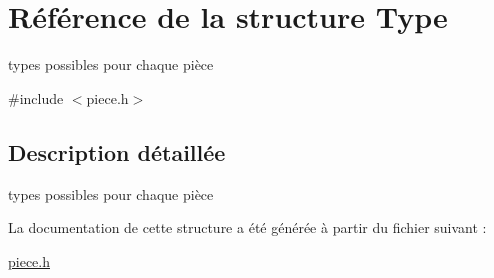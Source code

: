 \hypertarget{struct_type}{\section{Référence de la structure Type}
\label{struct_type}
}


types possibles pour chaque pièce  




{\ttfamily \#include $<$piece.\-h$>$}



\subsection{Description détaillée}
types possibles pour chaque pièce 

La documentation de cette structure a été générée à partir du fichier suivant \-:\begin{DoxyCompactItemize}
\item 
\hyperlink{piece_8h}{piece.\-h}\end{DoxyCompactItemize}

